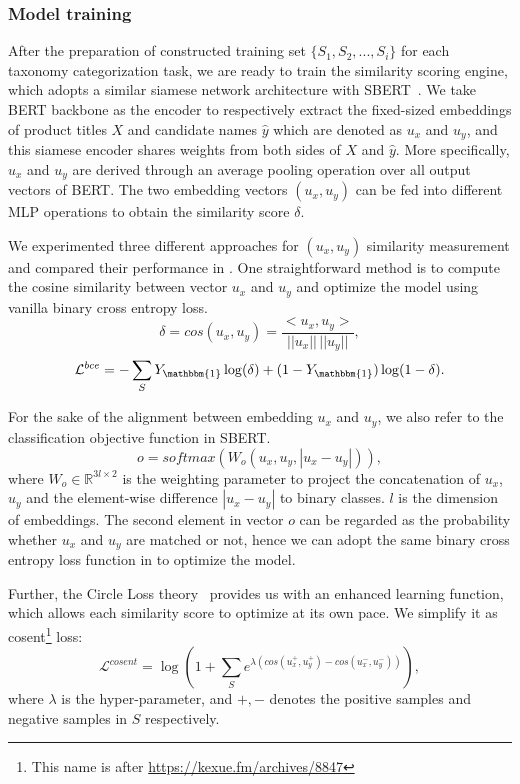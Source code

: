 \subsubsection{Model training}
After the preparation of constructed training set $\{S_1, S_2,...,S_i\}$ for each taxonomy categorization task, we are ready to train the similarity scoring engine, which adopts a similar siamese network architecture with SBERT~\cite{reimers2019sentence}. We take BERT backbone as the encoder to respectively extract the fixed-sized embeddings of product titles $X$ and candidate names $\hat{y}$ which are denoted as $u_x$ and $u_y$, and this siamese encoder shares weights from both sides of $X$ and $\hat{y}$. More specifically, $u_x$ and $u_y$ are derived through an average pooling operation over all output vectors of BERT. The two embedding vectors $(u_x, u_y)$ can be fed into different MLP operations to obtain the similarity score $\delta$. 

We experimented three different approaches for $(u_x, u_y)$ similarity measurement and compared their performance in . One straightforward method is to compute the cosine similarity between vector $u_x$ and $u_y$ and optimize the model using vanilla binary cross entropy loss.
\begin{equation}
    \delta=\textit{cos}(u_x,u_y)=\frac{<u_x, u_y>}{||u_x||\,||u_y||},
\end{equation}
\begin{equation}
\label{eq:bce}
    \mathcal{L}^{bce}=-\sum_{S} Y_{\mathbbm{1}} \log(\delta) + (1-Y_{\mathbbm{1}})\log(1-\delta).
\end{equation}

For the sake of the alignment between embedding $u_x$ and $u_y$, we also refer to the classification objective function in SBERT.
\begin{equation}
    o=softmax(W_o(u_x, u_y, |u_x-u_y|)),
\end{equation}
where $W_o\in \mathbb{R}^{3l\times 2}$ is the weighting parameter to project the concatenation of $u_x$, $u_y$ and the element-wise difference $|u_x-u_y|$ to binary classes. $l$ is the dimension of embeddings. The second element in vector $o$ can be regarded as the probability whether $u_x$ and $u_y$ are matched or not, hence we can adopt the same binary cross entropy loss function in  to optimize the model.

Further, the Circle Loss theory~\cite{sun2020circle} provides us with an enhanced learning function, which allows each similarity score to optimize at its own pace. We simplify it as cosent\footnote{This name is after \href{https://kexue.fm/archives/8847}{https://kexue.fm/archives/8847}} loss:
\begin{equation}
    \mathcal{L}^{cosent}=\log \left(1+\sum_{S} e^{\lambda (cos(u_x^+,u_y^+)-cos(u_x^-,u_y^-))}\right),
\end{equation}
where $\lambda$ is the hyper-parameter, and $+,-$ denotes the positive samples and negative samples in $S$ respectively.
